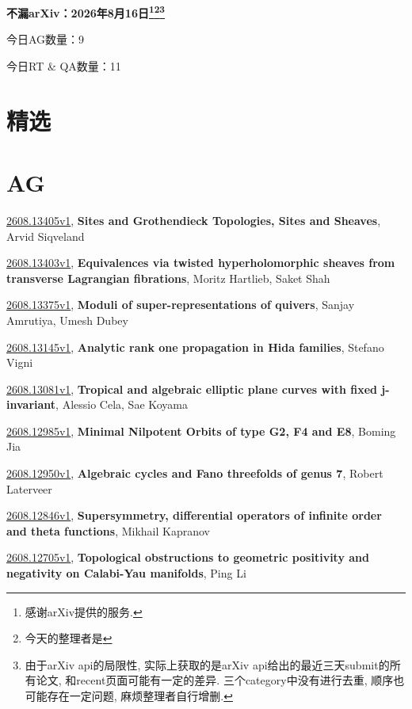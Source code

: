 \documentclass[9pt, a4paper]{article}
\theoremstyle{plain}
\theoremstyle{definition}
\theoremstyle{remark}
\newcommand{\arxiv}[3]{\href{https://arxiv.org/abs/#1}{#1}, \textbf{\textcolor{arxivblue}{#2}}, #3}
\newcommand{\AGnumber}{9}
\newcommand{\RTQAnumber}{11}
\newcommand{\NewestDate}{2026年8月16日}
\newcommand{\todayarXiver}{} %
\begin{document}
\begin{center}
    \Huge\textbf{不漏arXiv：\NewestDate\footnote{感谢arXiv提供的服务.}\footnote{今天的整理者是\todayarXiver}\footnote{由于arXiv api的局限性, 实际上获取的是arXiv api给出的最近三天submit的所有论文, 和recent页面可能有一定的差异. 三个category中没有进行去重, 顺序也可能存在一定问题, 麻烦整理者自行增删.}} \\
\end{center}

\setcounter{section}{-1}

\begin{center}
    今日AG数量：\AGnumber
    
    今日RT \& QA数量：\RTQAnumber
    
\end{center}


\section{精选}


\section{AG}
\arxiv{2608.13405v1}{Sites and Grothendieck Topologies, Sites and Sheaves}{Arvid Siqveland}

\arxiv{2608.13403v1}{Equivalences via twisted hyperholomorphic sheaves from transverse Lagrangian fibrations}{Moritz Hartlieb, Saket Shah}

\arxiv{2608.13375v1}{Moduli of super-representations of quivers}{Sanjay Amrutiya, Umesh Dubey}

\arxiv{2608.13145v1}{Analytic rank one propagation in Hida families}{Stefano Vigni}

\arxiv{2608.13081v1}{Tropical and algebraic elliptic plane curves with fixed j-invariant}{Alessio Cela, Sae Koyama}

\arxiv{2608.12985v1}{Minimal Nilpotent Orbits of type G2, F4 and E8}{Boming Jia}

\arxiv{2608.12950v1}{Algebraic cycles and Fano threefolds of genus 7}{Robert Laterveer}

\arxiv{2608.12846v1}{Supersymmetry, differential operators of infinite order and theta functions}{Mikhail Kapranov}

\arxiv{2608.12705v1}{Topological obstructions to geometric positivity and negativity on Calabi-Yau manifolds}{Ping Li}

\end{document}
